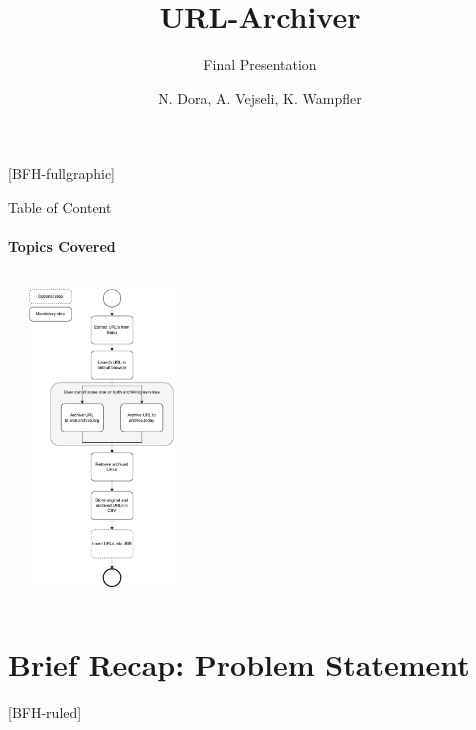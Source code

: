 \documentclass[
ngerman,%
authorontitle=true,
]{bfhbeamer}
\title{URL-Archiver}
\subtitle{Final Presentation}
\author[N. Dora \and A. Vejseli \and K. Wampfler]{N. Dora, A. Vejseli, K. Wampfler}
\institute{School of Engineering and Computer Science}
\begin{document}
	
	[BFH-fullgraphic]
	\maketitle
	
	
	
	\begin{frame}{Table of Content}
		\framesubtitle{Topics Covered}
		\begin{columns} %
			\begin{column}{0.4\textwidth} %
				\tableofcontents
			\end{column}
			\begin{column}{0.6\textwidth} %
				\begin{center}
					\includegraphics[width=0.3\textwidth]{figures/process_model-simple-vertikal}
				\end{center}
			\end{column}
		\end{columns}
	\end{frame}
	
	
	\section{Brief Recap: Problem Statement}
	[BFH-ruled]
	\frame{\sectionpage}
	
\end{document}
